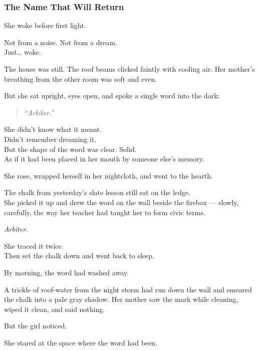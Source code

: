 \documentclass[12pt]{article}
\begin{document}
\subsubsection{The Name That Will Return}

She woke before first light.

Not from a noise. Not from a dream.\\
Just… woke.

The house was still. The roof beams clicked faintly with cooling air. Her mother’s breathing from the other room was soft and even.

But she sat upright, eyes open, and spoke a single word into the dark:

\begin{quote}
\textit{“Arbiter.”}
\end{quote}

She didn’t know what it meant.\\
Didn’t remember dreaming it.\\
But the shape of the word was clear. Solid.\\
As if it had been placed in her mouth by someone else’s memory.

\vspace{1em}

She rose, wrapped herself in her nightcloth, and went to the hearth.

The chalk from yesterday’s slate lesson still sat on the ledge.\\
She picked it up and drew the word on the wall beside the firebox --- slowly, carefully, the way her teacher had taught her to form civic terms.

\begin{center}
\textit{Arbiter.}
\end{center}

She traced it twice.\\
Then set the chalk down and went back to sleep.

\vspace{1em}

By morning, the word had washed away.

A trickle of roof-water from the night storm had run down the wall and smeared the chalk into a pale gray shadow. Her mother saw the mark while cleaning, wiped it clean, and said nothing.

But the girl noticed.

She stared at the space where the word had been.
\end{document}
